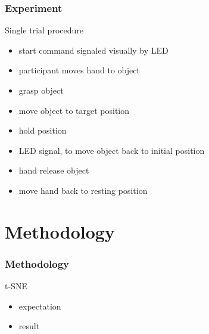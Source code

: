 \documentclass{beamer}
\begin{document}
\begin{frame}
\frametitle{Experiment}

Single trial procedure
\begin{itemize}
	\item start command signaled visually by LED
	\item participant moves hand to object
    \item grasp object
    \item move object to target position
    \item hold position
    \item LED signal, to move object back to initial position
    \item hand release object
    \item move hand back to resting position
\end{itemize}
\end{frame}



\section{Methodology}

\begin{frame}
\frametitle{Methodology}
t-SNE
\begin{itemize}
    \item expectation
    \item result
\end{itemize}
\end{frame}
\end{document}
